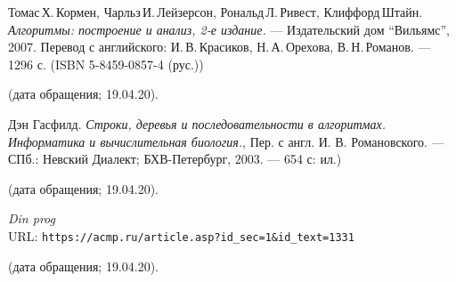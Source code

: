 \begin{thebibliography}{99}

Томас\,Х.\,Кормен, Чарльз\,И.\,Лейзерсон, Рональд\,Л.\,Ривест, Клиффорд\,Штайн.
{\itshape Алгоритмы: построение и анализ, 2-е издание.} --- Издательский дом \enquote{Вильямс}, 2007. Перевод с английского: И.\,В.\,Красиков, Н.\,А.\,Орехова, В.\,Н.\,Романов. --- 1296 с. (ISBN 5-8459-0857-4 (рус.))

(дата обращения; 19.04.20).

Дэн Гасфилд. 
{\itshape Строки, деревья и последовательности в алгоритмах. Информатика и вычислительная биология.}, Пер. с англ. И. В. Романовского. — СПб.: Невский Диалект; БХВ-Петербург, 2003. — 654 с: ил.)

(дата обращения; 19.04.20).

{\itshape Din prog} \\URL: \texttt{https://acmp.ru/article.asp?id_sec=1&id_text=1331}

(дата обращения; 19.04.20).

\end{thebibliography}
\pagebreak
